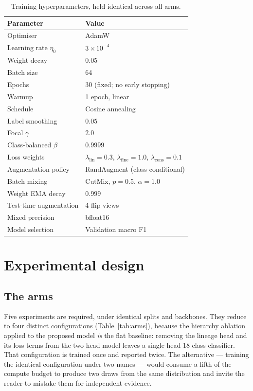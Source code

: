 \documentclass[11pt,a4paper]{article}
\begin{document}
\begin{table}[H]
  \centering
  \small
  \caption{Training hyperparameters, held identical across all arms.}
  \label{tab:hyper}
  \begin{tabular}{@{}ll@{}}
    \toprule
    Parameter & Value \\
    \midrule
    Optimiser                 & AdamW \\
    Learning rate $\eta_0$    & $3 \times 10^{-4}$ \\
    Weight decay              & $0.05$ \\
    Batch size                & 64 \\
    Epochs                    & 30 (fixed; no early stopping) \\
    Warmup                    & 1 epoch, linear \\
    Schedule                  & Cosine annealing \\
    Label smoothing           & $0.05$ \\
    Focal $\gamma$            & $2.0$ \\
    Class-balanced $\beta$    & $0.9999$ \\
    Loss weights              & $\lambda_{\text{lin}}=0.3$, $\lambda_{\text{fine}}=1.0$, $\lambda_{\text{cons}}=0.1$ \\
    Augmentation policy       & RandAugment (class-conditional) \\
    Batch mixing              & CutMix, $p = 0.5$, $\alpha = 1.0$ \\
    Weight EMA decay          & $0.999$ \\
    Test-time augmentation    & 4 flip views \\
    Mixed precision           & bfloat16 \\
    Model selection           & Validation macro F1 \\
    \bottomrule
  \end{tabular}
\end{table}

\section{Experimental design}

\subsection{The arms}

Five experiments are required, under identical splits and backbones. They reduce
to four distinct configurations (Table~\ref{tab:arms}), because the hierarchy
ablation applied to the proposed model \emph{is} the flat baseline: removing the
lineage head and its loss terms from the two-head model leaves a single-head
18-class classifier. That configuration is trained once and reported twice. The
alternative --- training the identical configuration under two names --- would
consume a fifth of the compute budget to produce two draws from the same
distribution and invite the reader to mistake them for independent evidence.
\end{document}
